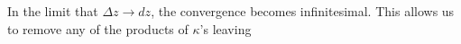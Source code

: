 In the limit that $\Delta z \rightarrow dz$, the convergence becomes infinitesimal. This allows us to remove any of the products of $\kappa$'s leaving